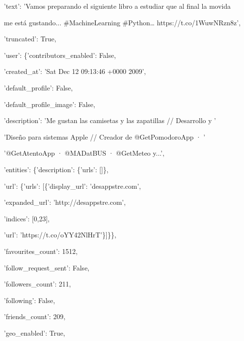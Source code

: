 \quad'text': 'Vamos preparando el siguiente libro a estudiar que al final la movida 

\hspace{1.7cm}me está gustando... \#MachineLearning \#Python… https://t.co/1WuwNRzn8z',

\quad'truncated': True,

\quad'user': \{'contributors\_enabled': False,

\hspace{1.7cm}'created\_at': 'Sat Dec 12 09:13:46 +0000 2009',

\hspace{1.7cm}'default\_profile': False,

\hspace{1.7cm}'default\_profile\_image': False,

\hspace{1.7cm}'description': 'Me gustan las camisetas y las  zapatillas // Desarrollo y '

\hspace{3cm}'Diseño para sistemas Apple //  Creador de @GetPomodoroApp ·  '

\hspace{3cm}'@GetAtentoApp · @MADatBUS ·  @GetMeteo y...',

\hspace{1.7cm}'entities': \{'description': \{'urls': []\},

\hspace{3.5cm}'url': \{'urls': [\{'display\_url': 'desappstre.com',

\hspace{4.5cm}'expanded\_url': 'http://desappstre.com',

\hspace{4.5cm}'indices': [0,23],

\hspace{4.5cm}'url': 'https://t.co/oYY42NlHrT'\}]\}\},

\hspace{1.7cm}'favourites\_count': 1512,

\hspace{1.7cm}'follow\_request\_sent': False,

\hspace{1.7cm}'followers\_count': 211,

\hspace{1.7cm}'following': False,

\hspace{1.7cm}'friends\_count': 209,

\hspace{1.7cm}'geo\_enabled': True,

